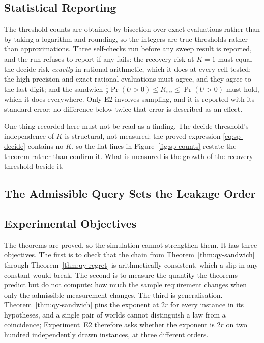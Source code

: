 \documentclass[conference]{IEEEtran}
\theoremstyle{definition}
\begin{document}
\subsection{Statistical Reporting}

The threshold counts are obtained by bisection over exact evaluations rather than by taking a
logarithm and rounding, so the integers are true thresholds rather than approximations. Three
self-checks run before any sweep result is reported, and the run refuses to report if any
fails: the recovery risk at $K=1$ must equal the decide risk \emph{exactly} in rational
arithmetic, which it does at every cell tested; the high-precision and exact-rational
evaluations must agree, and they agree to the last digit; and the sandwich
$\tfrac12\Pr(U>0)\le R_{\mathrm{rec}}\le\Pr(U>0)$ must hold, which it does everywhere. Only
E2 involves sampling, and it is reported with its standard error; no difference below twice
that error is described as an effect.

One thing recorded here must not be read as a finding. The decide threshold's independence of
$K$ is structural, not measured: the proved expression \eqref{eq:sp-decide} contains no $K$, so
the flat lines in Figure~\ref{fig:sp-counts} restate the theorem rather than confirm it. What is
measured is the growth of the recovery threshold beside it.


\subsection{The Admissible Query Sets the Leakage Order}
\label{sec:qy-expdesign}

\subsection{Experimental Objectives}

The theorems are proved, so the simulation cannot strengthen them. It has three objectives.
The first is to check that the chain from Theorem~\ref{thm:qy-sandwich} through
Theorem~\ref{thm:qy-regret} is arithmetically consistent, which a slip in any constant would
break. The second is to measure the quantity the theorems predict but do not compute: how
much the sample requirement changes when only the admissible measurement changes. The third
is generalisation. Theorem~\ref{thm:qy-sandwich} pins the exponent at $2r$ for every instance in
its hypotheses, and a single pair of worlds cannot distinguish a law from a coincidence;
Experiment~E2 therefore asks whether the exponent is $2r$ on two hundred independently drawn
instances, at three different orders.
\end{document}
